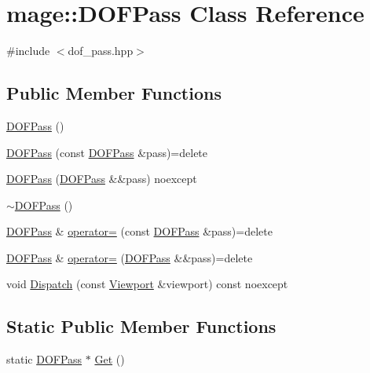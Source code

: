 \hypertarget{classmage_1_1_d_o_f_pass}{}\section{mage\+:\+:D\+O\+F\+Pass Class Reference}
\label{classmage_1_1_d_o_f_pass}


{\ttfamily \#include $<$dof\+\_\+pass.\+hpp$>$}

\subsection*{Public Member Functions}
\begin{DoxyCompactItemize}
\item 
\hyperlink{classmage_1_1_d_o_f_pass_a11dccae5f2613da112845158f69727e7}{D\+O\+F\+Pass} ()
\item 
\hyperlink{classmage_1_1_d_o_f_pass_a5e8715db10b77bd090e3be9c8df7a0b5}{D\+O\+F\+Pass} (const \hyperlink{classmage_1_1_d_o_f_pass}{D\+O\+F\+Pass} \&pass)=delete
\item 
\hyperlink{classmage_1_1_d_o_f_pass_a1b40c130a685c9242029cc9d99db1795}{D\+O\+F\+Pass} (\hyperlink{classmage_1_1_d_o_f_pass}{D\+O\+F\+Pass} \&\&pass) noexcept
\item 
\hyperlink{classmage_1_1_d_o_f_pass_a2a46bc7b2579f1d67fd412c89386d2f4}{$\sim$\+D\+O\+F\+Pass} ()
\item 
\hyperlink{classmage_1_1_d_o_f_pass}{D\+O\+F\+Pass} \& \hyperlink{classmage_1_1_d_o_f_pass_a692f9193e68b26b8643cae4075af658b}{operator=} (const \hyperlink{classmage_1_1_d_o_f_pass}{D\+O\+F\+Pass} \&pass)=delete
\item 
\hyperlink{classmage_1_1_d_o_f_pass}{D\+O\+F\+Pass} \& \hyperlink{classmage_1_1_d_o_f_pass_a153afdafbeb6542cee6f8bc98672e6cc}{operator=} (\hyperlink{classmage_1_1_d_o_f_pass}{D\+O\+F\+Pass} \&\&pass)=delete
\item 
void \hyperlink{classmage_1_1_d_o_f_pass_a772b6b1b4a1f5a588f2c3342ef187db6}{Dispatch} (const \hyperlink{classmage_1_1_viewport}{Viewport} \&viewport) const noexcept
\end{DoxyCompactItemize}
\subsection*{Static Public Member Functions}
\begin{DoxyCompactItemize}
\item 
static \hyperlink{classmage_1_1_d_o_f_pass}{D\+O\+F\+Pass} $\ast$ \hyperlink{classmage_1_1_d_o_f_pass_a93327517f36b8558d6bdffedb6179298}{Get} ()
\end{DoxyCompactItemize}

